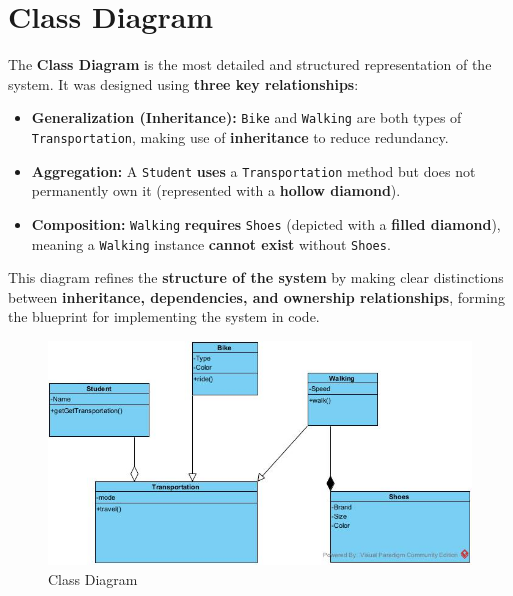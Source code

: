 \section{Class Diagram}
The \textbf{Class Diagram} is the most detailed and structured representation of the system. It was designed using \textbf{three key relationships}:
\begin{itemize}
    \item \textbf{Generalization (Inheritance):} \texttt{Bike} and \texttt{Walking} are both types of \texttt{Transportation}, making use of \textbf{inheritance} to reduce redundancy.
    \item \textbf{Aggregation:} A \texttt{Student} \textbf{uses} a \texttt{Transportation} method but does not permanently own it (represented with a \textbf{hollow diamond}).
    \item \textbf{Composition:} \texttt{Walking} \textbf{requires} \texttt{Shoes} (depicted with a \textbf{filled diamond}), meaning a \texttt{Walking} instance \textbf{cannot exist} without \texttt{Shoes}.
\end{itemize}

This diagram refines the \textbf{structure of the system} by making clear distinctions between \textbf{inheritance, dependencies, and ownership relationships}, forming the blueprint for implementing the system in code.


\begin{figure}[h]
    \centering
    \includegraphics[scale=0.6]{Book-SSW565/jpg/ArchitectureModeling/Class Diagram1.jpg}
    \caption{\label{Figure::Class Diagram}Class Diagram}
\end{figure}

